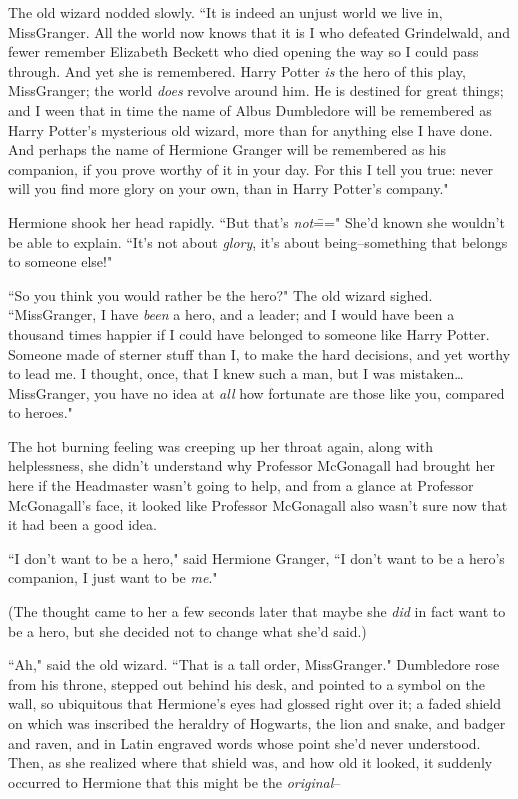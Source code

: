 The old wizard nodded slowly. ``It is indeed an unjust world we live in, Miss\?Granger. All the world now knows that it is I who defeated Grindelwald, and fewer remember Elizabeth Beckett who died opening the way so I could pass through. And yet she is remembered. Harry Potter \emph{is} the hero of this play, Miss\?Granger; the world \emph{does} revolve around him. He is destined for great things; and I ween that in time the name of Albus Dumbledore will be remembered as Harry Potter's mysterious old wizard, more than for anything else I have done. And perhaps the name of Hermione Granger will be remembered as his companion, if you prove worthy of it in your day. For this I tell you true: never will you find more glory on your own, than in Harry Potter's company."

Hermione shook her head rapidly. ``But that's \emph{not}\===" She'd known she wouldn't be able to explain. ``It's not about \emph{glory}, it's about being\---something that belongs to someone else!"

``So you think you would rather be the hero?" The old wizard sighed. ``Miss\?Granger, I have \emph{been} a hero, and a leader; and I would have been a thousand times happier if I could have belonged to someone like Harry Potter. Someone made of sterner stuff than I, to make the hard decisions, and yet worthy to lead me. I thought, once, that I knew such a man, but I was mistaken{\ldots} Miss\?Granger, you have no idea at \emph{all} how fortunate are those like you, compared to heroes."

The hot burning feeling was creeping up her throat again, along with helplessness, she didn't understand why Professor McGonagall had brought her here if the Headmaster wasn't going to help, and from a glance at Professor McGonagall's face, it looked like Professor McGonagall also wasn't sure now that it had been a good idea.

``I don't want to be a hero," said Hermione Granger, ``I don't want to be a hero's companion, I just want to be \emph{me}."

(The thought came to her a few seconds later that maybe she \emph{did} in fact want to be a hero, but she decided not to change what she'd said.)

``Ah," said the old wizard. ``That is a tall order, Miss\?Granger." Dumbledore rose from his throne, stepped out behind his desk, and pointed to a symbol on the wall, so ubiquitous that Hermione's eyes had glossed right over it; a faded shield on which was inscribed the heraldry of Hogwarts, the lion and snake, and badger and raven, and in Latin engraved words whose point she'd never understood. Then, as she realized where that shield was, and how old it looked, it suddenly occurred to Hermione that this might be the \emph{original}\---

